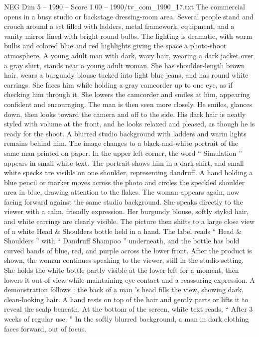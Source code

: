 \begin{textsample}{NEG Dim 5 – 1990 – Score 1.00 – 1990/tv\_com\_1990\_17.txt}  \label{ex:f5_neg_088}
The commercial opens in a busy studio or backstage dressing-room area.
Several people stand and crouch around a set filled with ladders, metal framework, equipment, and a vanity mirror lined with bright round bulbs.
The lighting is dramatic, with warm bulbs and colored blue and red highlights giving the space a photo-shoot atmosphere.
A young adult man with dark, wavy hair, wearing a dark jacket over a gray shirt, stands near a young adult woman.
She has shoulder-length brown hair, wears a burgundy blouse tucked into light blue jeans, and has round white earrings.
She faces him while holding a gray camcorder up to one eye, as if checking him through it.
She lowers the camcorder and smiles at him, appearing confident and encouraging.
The man is then seen more closely.
He smiles, glances down, then looks toward the camera and off to the side.
His dark hair is neatly styled with volume at the front, and he looks relaxed and pleased, as though he is ready for the shoot.
A blurred studio background with ladders and warm lights remains behind him.
The image changes to a black-and-white portrait of the same man printed on paper.
In the upper left corner, the word “ Simulation ” appears in small white text.
The portrait shows him in a dark shirt, and small white specks are visible on one shoulder, representing dandruff.
A hand holding a blue pencil or marker moves across the photo and circles the speckled shoulder area in blue, drawing attention to the flakes.
The woman appears again, now facing forward against the same studio background.
She speaks directly to the viewer with a calm, friendly expression.
Her burgundy blouse, softly styled hair, and white earrings are clearly visible.
The picture then shifts to a large close view of a white Head \& Shoulders bottle held in a hand.
The label reads “ Head \& Shoulders ” with “ Dandruff Shampoo ” underneath, and the bottle has bold curved bands of blue, red, and purple across the lower front.
After the product is shown, the woman continues speaking to the viewer, still in the studio setting.
She holds the white bottle partly visible at the lower left for a moment, then lowers it out of view while maintaining eye contact and a reassuring expression.
A demonstration follows : the back of a man ’s head fills the view, showing dark, clean-looking hair.
A hand rests on top of the hair and gently parts or lifts it to reveal the scalp beneath.
At the bottom of the screen, white text reads, “ After 3 weeks of regular use. ” In the softly blurred background, a man in dark clothing faces forward, out of focus.

\end{textsample}
